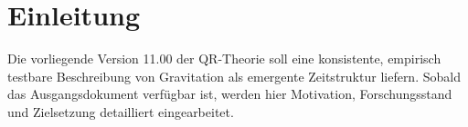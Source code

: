 \section{Einleitung}
Die vorliegende Version 11.00 der QR-Theorie soll eine konsistente, empirisch testbare Beschreibung
von Gravitation als emergente Zeitstruktur liefern. Sobald das Ausgangsdokument verf\"ugbar ist,
werden hier Motivation, Forschungsstand und Zielsetzung detailliert eingearbeitet.

